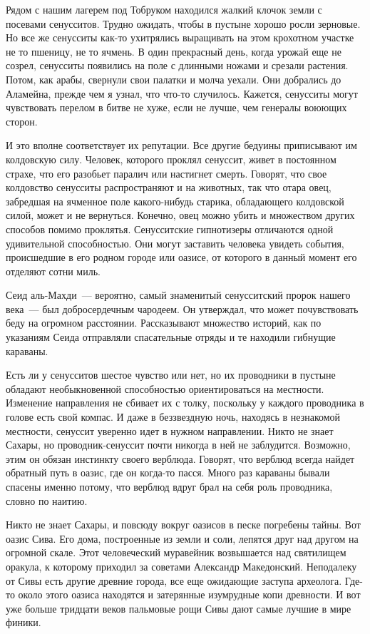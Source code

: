 \documentclass[12pt,a4paper,twoside,openany,svgnames]{memoir}
\begin{document}
Рядом с нашим лагерем под Тобруком находился жалкий клочок земли с посевами сенусситов. Трудно ожидать, чтобы в пустыне хорошо росли зерновые. Но все же сенусситы как-то ухитрялись выращивать на этом крохотном участке не то пшеницу, не то ячмень. В один прекрасный день, когда урожай еще не созрел, сенусситы появились на поле с длинными ножами и срезали растения. Потом, как арабы, свернули свои палатки и молча уехали. Они добрались до Аламейна, прежде чем я узнал, что что-то случилось. Кажется, сенусситы могут чувствовать перелом в битве не хуже, если не лучше, чем генералы воюющих сторон.

И это вполне соответствует их репутации. Все другие бедуины приписывают им колдовскую силу. Человек, которого проклял сенуссит, живет в постоянном страхе, что его разобьет паралич или настигнет смерть. Говорят, что свое колдовство сенусситы распространяют и на животных, так что отара овец, забредшая на ячменное поле какого-нибудь старика, обладающего колдовской силой, может и не вернуться. Конечно, овец можно убить и множеством других способов помимо проклятья. Сенусситские гипнотизеры отличаются одной удивительной способностью. Они могут заставить человека увидеть события, происшедшие в его родном городе или оазисе, от которого в данный момент его отделяют сотни миль.

Сеид аль-Махди~--- вероятно, самый знаменитый сенусситский пророк нашего века~--- был добросердечным чародеем. Он утверждал, что может почувствовать беду на огромном расстоянии. Рассказывают множество историй, как по указаниям Сеида отправляли спасательные отряды и те находили гибнущие караваны.

Есть ли у сенусситов шестое чувство или нет, но их проводники в пустыне обладают необыкновенной способностью ориентироваться на местности. Изменение направления не сбивает их с толку, поскольку у каждого проводника в голове есть свой компас. И даже в беззвездную ночь, находясь в незнакомой местности, сенуссит уверенно идет в нужном направлении. Никто не знает Сахары, но проводник-сенуссит почти никогда в ней не заблудится. Возможно, этим он обязан инстинкту своего верблюда. Говорят, что верблюд всегда найдет обратный путь в оазис, где он когда-то пасся. Много раз караваны бывали спасены именно потому, что верблюд вдруг брал на себя роль проводника, словно по наитию.

Никто не знает Сахары, и повсюду вокруг оазисов в песке погребены тайны. Вот оазис Сива. Его дома, построенные из земли и соли, лепятся друг над другом на огромной скале. Этот человеческий муравейник возвышается над святилищем оракула, к которому приходил за советами Александр Македонский. Неподалеку от Сивы есть другие древние города, все еще ожидающие заступа археолога. Где-то около этого оазиса находятся и затерянные изумрудные копи древности. И вот уже больше тридцати веков пальмовые рощи Сивы дают самые лучшие в мире финики.
\end{document}
